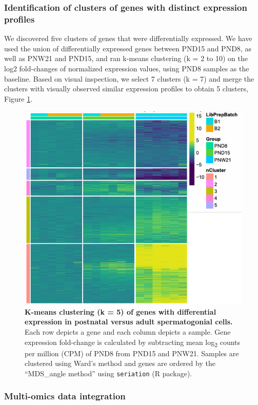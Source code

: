 \documentclass[12pt,twoside]{reedthesis}
\begin{document}
\hypertarget{identification-of-clusters-of-genes-with-distinct-expression-profiles}{%
\subsubsection{Identification of clusters of genes with distinct expression profiles}\label{identification-of-clusters-of-genes-with-distinct-expression-profiles}}

We discovered five clusters of genes that were differentially expressed.
We have used the union of differentially expressed genes between PND15
and PND8, as well as PNW21 and PND15, and ran k-means clustering (k = 2
to 10) on the log2 fold-changes of normalized expression values, using
PND8 samples as the baseline. Based on visual inspection, we select 7
clusters (k = 7) and merge the clusters with visually observed similar
expression profiles to obtain 5 clusters, Figure \ref{fig:dn3}.







\begin{figure}[htbp]

{\centering \includegraphics{thesis_files/figure-latex/dn3-1} 

}

\caption[K-means clustering of differentiallly expressed genes]{\textbf{K-means clustering (k = 5) of genes with differential expression in postnatal versus adult spermatogonial cells.}
Each row depicts a gene and each column depicts a sample. Gene
expression fold-change is calculated by subtracting mean
log\textsubscript{2} counts per million (CPM) of PND8 from PND15 and
PNW21. Samples are clustered using Ward's method and genes are ordered
by the ``MDS\_angle method'' using \texttt{seriation} (R package).}\label{fig:dn3}
\end{figure}
\hypertarget{multi-omics-data-integration-1}{%
\subsubsection{Multi-omics data integration}\label{multi-omics-data-integration-1}}
\end{document}
